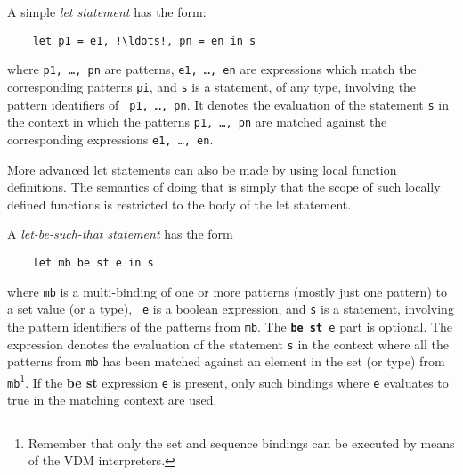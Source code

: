 \documentclass{overturerepchap}
\newcommand{\keyw}[1]{{\bf\ttfamily #1}}
\begin{document}
{\begin{description}
  A simple {\it let statement} has the form:
  \begin{lstlisting}
    let p1 = e1, !\ldots!, pn = en in s
  \end{lstlisting}
  where {\tt p1, \ldots, pn} are patterns, {\tt e1, \ldots, en} are
  expressions which match the corresponding patterns {\tt pi}, and {\tt s}
  is a statement, of any type, involving the pattern identifiers of {\tt
    p1, \ldots, pn}. It denotes the evaluation of the statement {\tt s} in
  the context in which the patterns {\tt p1, \ldots, pn} are matched
  against the corresponding expressions {\tt e1, \ldots, en}.

  More advanced let statements can also be made by using local function
  definitions. The semantics of doing that is simply that the scope of such
  locally defined functions is restricted to the body of the let statement.

  A {\it let-be-such-that statement} has the form
  \begin{lstlisting}
    let mb be st e in s
  \end{lstlisting}
  where {\tt mb} is a multi-binding of one or more patterns (mostly
  just one pattern) to a set value (or a type), {\tt
    e} is a boolean expression, and {\tt s} is a statement, involving the
  pattern identifiers of the patterns from {\tt mb}. The {\tt \keyw{be st} e}
  part is optional. The expression denotes the evaluation of the statement
  {\tt s} in the context where all the patterns from {\tt mb} has been matched
  against an element in the set (or type) from {\tt mb}\footnote{Remember
    that only the set and sequence bindings can be executed by means of the
    VDM interpreters.}.
  If the \keyw{be st}
  expression {\tt e} is present, only such bindings where {\tt e} evaluates
  to true in the matching context are used.


\end{description}}
\end{document}
